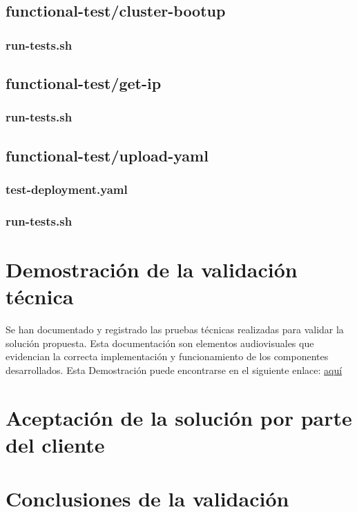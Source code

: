 \subsection{functional-test/cluster-bootup}
\noindent

\subsubsection{run-tests.sh}
\noindent




\subsection{functional-test/get-ip}
\noindent

\subsubsection{run-tests.sh}
\noindent





\subsection{functional-test/upload-yaml}

\subsubsection{test-deployment.yaml}
\noindent



\subsubsection{run-tests.sh}
\noindent



\section{Demostración de la validación técnica}
\noindent
Se han documentado y registrado las pruebas técnicas realizadas para validar la solución propuesta. Esta documentación son elementos audiovisuales que evidencian la correcta implementación y funcionamiento de los componentes desarrollados. Esta Demostración puede encontrarse en el siguiente enlace: \href{https://drive.google.com/drive/folders/1UgpmFmz7E2uYxv_FCGCpYArZDIMc0nxv?usp=sharing}{aquí}


\section{Aceptación de la solución por parte del cliente}

\section{Conclusiones de la validación}
